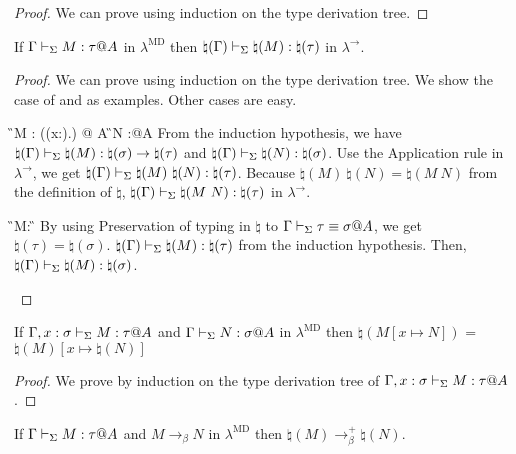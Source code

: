 \begin{proof}
    We can prove using induction on the type derivation tree.
\end{proof}

\begin{lemma}
    If $\G \V M:\tau@A$ in $\lambda^{\text{MD}}$ then $\natural(\Gamma) \vdash_\Sigma \natural(M): \natural(\tau)$ in $\lambda^\to$.
\end{lemma}

\begin{proof}
    We can prove using induction on the type derivation tree.
    We show the case of \TApp{} and \TConv{} as examples.
    Other cases are easy.
    \begin{rneqncase}{\TApp{}}{
            \G \V M : (\Pi(x:\sigma).\tau) @ A  \G \V N :\sigma @A
        }
        From the induction hypothesis, we have $\natural(\Gamma) \vdash_\Sigma \natural(M) : \natural(\sigma) \to \natural(\tau)$ and $\natural(\Gamma) \vdash_\Sigma \natural(N) : \natural(\sigma)$.
        Use the Application rule in $\lambda^\to$, we get $\natural(\G) \V \natural(M)\ \natural(N) : \natural(\tau)$.
        Because $\natural(M)\ \natural(N) = \natural(M\ N)$ from the definition of $\natural$, $\natural(\Gamma) \vdash_\Sigma \natural(M\ N) : \natural(\tau)$ in $\lambda^\to$.
    \end{rneqncase}
    \begin{rneqncase}{\TConv{}}{
            \G\V M:\tau@A {} \G\V \tau\E\sigma@A
        }
        By using Preservation of typing in $\natural$ to $\G\V \tau\E\sigma@A$, we get $\natural(\tau) = \natural(\sigma)$.
        $\natural(\Gamma) \vdash_\Sigma \natural(M):\natural(\tau)$ from the induction hypothesis.
        Then, $\natural(\Gamma) \vdash_\Sigma \natural(M):\natural(\sigma)$.
    \end{rneqncase}

\end{proof}

\begin{lemma}
    If $\G, x:\sigma \V M:\tau@A$ and $\G \V N:\sigma@A$ in $\lambda^{\text{MD}}$
    then $\natural(M[x \mapsto N])$ = $\natural(M)[x\mapsto\natural(N)]$
\end{lemma}

\begin{proof}
    We prove by induction on the type derivation tree of $\G, x:\sigma \V M:\tau@A$.
\end{proof}

\begin{lemma}
    If $\G \V M:\tau@A$ and $M \longrightarrow_\beta N$ in $\lambda^{\text{MD}}$
    then $\natural(M) \longrightarrow_\beta^+ \natural(N)$.
\end{lemma}

